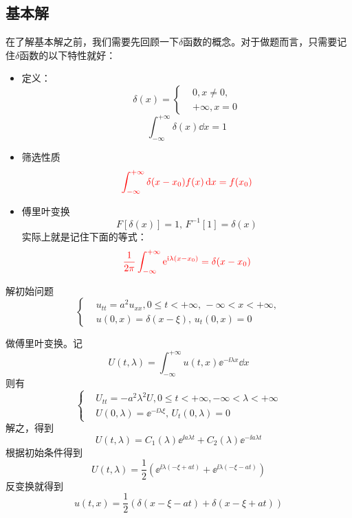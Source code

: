 \subsection{基本解}
在了解基本解之前，我们需要先回顾一下$\delta$函数的概念。对于做题而言，只需要记住$\delta$函数的以下特性就好：
\begin{itemize}
    \item 定义：
        \begin{equation*}
            \delta(x) = 
            \left\{
                \begin{aligned}
                    &0, x \neq 0,\\
                    &+\infty, x = 0
                \end{aligned}
            \right.
        \end{equation*}
        \[\int_{-\infty}^{+\infty} \delta(x) \dd{x} = 1\]
    \item 筛选性质
        \[{\color{red}{\int_{-\infty}^{+\infty} \delta(x - x_0) f(x) \dd{x} = f(x_0)}}\]
    \item 傅里叶变换
        \[F[\delta(x)] = 1,\, F^{-1}[1] = \delta(x)\]
        实际上就是记住下面的等式：
        \[{\color{red}\frac{1}{2 \pi} \int_{-\infty}^{+\infty} \mathrm{e}^{\mathrm{i} \lambda \left(x - x_0\right)} = \delta(x - x_0)}\]
\end{itemize}
\begin{problembox}
    \begin{example}\label{eg:3.3}
        解初始问题
        \begin{equation*}
            \left\{
                \begin{aligned}
                    &u_{tt} = a^2 u_{xx}, 0 \leq t < +\infty,\, -\infty < x < +\infty,\\
                    &u(0, x) = \delta(x - \xi),\, u_t(0, x) = 0
                \end{aligned}
            \right.
        \end{equation*}
    \end{example}
    \begin{solution}
        做傅里叶变换。记
        \[U(t, \lambda) = \int_{-\infty}^{+\infty} u(t, x) \ee^{-\ii \lambda x} \dd{x}\]
        则有
        \begin{equation*}
            \left\{
                \begin{aligned}
                    &U_{tt} = -a^2 \lambda^2 U, 0 \leq t < +\infty, -\infty < \lambda < +\infty\\
                    &U(0, \lambda) = \ee^{-\ii \lambda \xi},\, U_t(0, \lambda) = 0
                \end{aligned}
            \right.
        \end{equation*}
        解之，得到
        \[U(t, \lambda) = C_1(\lambda) \ee^{\ii a \lambda t} + C_2(\lambda) \ee^{-\ii a \lambda t}\]
        根据初始条件得到
        \[U(t, \lambda) = \frac{1}{2}\left(\ee^{\ii \lambda \left(-\xi + a t\right)} + \ee^{\ii \lambda \left(-\xi - a t\right)}\right)\]
        反变换就得到
        \[u(t, x) = \frac{1}{2}\left(\delta(x - \xi - a t) + \delta(x - \xi + a t)\right)\]
    \end{solution}
\end{problembox}

